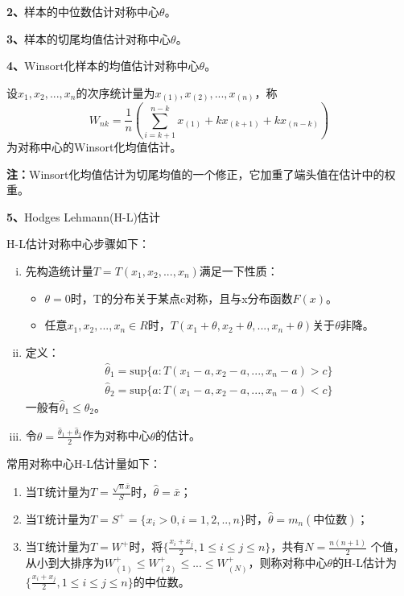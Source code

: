 \documentclass[lang=cn,10pt]{elegantbook}
\begin{document}
\textbf{2、}样本的中位数估计对称中心$\theta$。

\textbf{3、}样本的切尾均值估计对称中心$\theta$。

\textbf{4、}Winsort化样本的均值估计对称中心$\theta$。
\begin{definition}
    设$x_1,x_2,...,x_n$的次序统计量为$x_{(1)},x_{(2)},...,x_{(n)}$，称
    \begin{equation}
        W_{nk} = \frac1n(\sum_{i = k+1}^{n-k}x_{(1)} + kx_{(k+1)} + kx_{(n-k)})
    \end{equation}
    为对称中心的Winsort化均值估计。
\end{definition}
\textbf{注：}Winsort化均值估计为切尾均值的一个修正，它加重了端头值在估计中的权重。

\textbf{5、}Hodges Lehmann(H-L)估计

H-L估计对称中心步骤如下：
\begin{enumerate}[(i)]
    \item 先构造统计量$T = T(x_1,x_2,...,x_n)$满足一下性质：
          \begin{itemize}
              \item $\theta = 0$时，T的分布关于某点c对称，且与x分布函数$F(x)$。
              \item 任意$x_1,x_2,...,x_n\in R$时，$T(x_1+\theta,x_2+\theta,...,x_n+\theta)$关于$\theta$非降。
          \end{itemize}
    \item 定义：
          \begin{equation}
              \begin{aligned}
                  \hat{\theta}_1 = \mathrm{sup}\{a:T(x_1-a,x_2-a,...,x_n-a)>c\} \\
                  \hat{\theta}_2 = \mathrm{sup}\{a:T(x_1-a,x_2-a,...,x_n-a)<c\}
              \end{aligned}
          \end{equation}
          一般有$\hat{\theta}_1 \leq\hat{\theta}_2$。
    \item 令$\theta = \frac{\hat{\theta}_1+\hat{\theta}_2}2$作为对称中心$\theta$的估计。
\end{enumerate}
常用对称中心H-L估计量如下：
\begin{enumerate}[(1)]
    \item 当T统计量为$T = \frac{\sqrt{n}\bar{x}}{S}$时，$\hat{\theta} = \bar{x}$；
    \item 当T统计量为$T = S^+= \{x_i>0,i = 1,2,..,n\}$时，$\hat{\theta} = m_n(\text{中位数})$；
    \item 当T统计量为$T = W^+$时，将$\{\frac{x_i+x_j}{2},1\leq i\leq j\leq n\}$，共有$N = \frac{n(n+1)}{2}$
          个值，从小到大排序为$W_{(1)}^+\leq W_{(2)}^+\leq...\leq W_{(N)}^+$，则称对称中心$\theta$的H-L估计为
          $\{\frac{x_i+x_j}{2},1\leq i\leq j\leq n\}$的中位数。
\end{enumerate}
\end{document}
